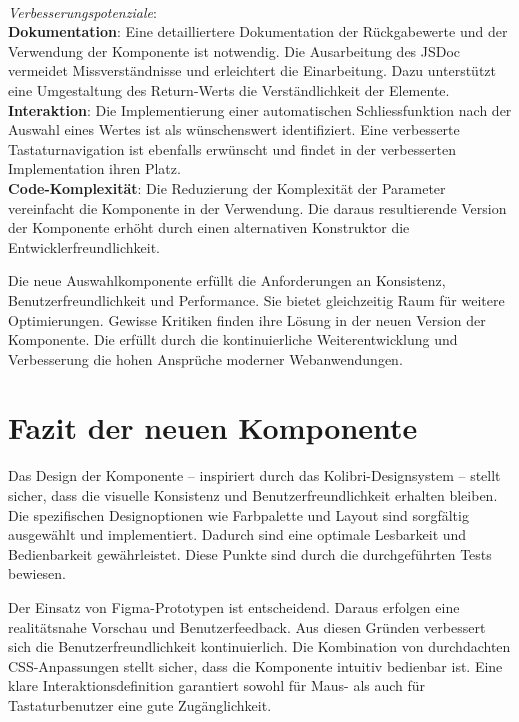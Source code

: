 \\
\noindent
\emph{Verbesserungspotenziale}: 
\\
\textbf{Dokumentation}: 
Eine detailliertere Dokumentation der Rückgabewerte und der Verwendung der Komponente ist notwendig. 
Die Ausarbeitung des JSDoc vermeidet Missverständnisse und erleichtert die Einarbeitung. 
Dazu unterstützt eine Umgestaltung des Return-Werts die Verständlichkeit der Elemente. 
\\
\textbf{Interaktion}: 
Die Implementierung einer automatischen Schliessfunktion nach der Auswahl eines Wertes ist als wünschenswert identifiziert. 
Eine verbesserte Tastaturnavigation ist ebenfalls erwünscht und findet in der verbesserten Implementation ihren Platz. 
\\
\textbf{Code-Komplexität}: 
Die Reduzierung der Komplexität der Parameter vereinfacht die Komponente in der Verwendung. 
Die daraus resultierende Version der Komponente erhöht durch einen alternativen Konstruktor die Entwicklerfreundlichkeit. 

Die neue Auswahlkomponente erfüllt die Anforderungen an Konsistenz, Benutzerfreundlichkeit und Performance. 
Sie bietet gleichzeitig Raum für weitere Optimierungen. 
Gewisse Kritiken finden ihre Lösung in der neuen Version der Komponente. 
Die  erfüllt durch die kontinuierliche Weiterentwicklung und Verbesserung die hohen Ansprüche moderner Webanwendungen. 


\section{Fazit der neuen Komponente}
\label{sec:summeryNew}

Das Design der Komponente – inspiriert durch das Kolibri-Designsystem – stellt sicher, dass die visuelle Konsistenz und Benutzerfreundlichkeit erhalten bleiben. 
Die spezifischen Designoptionen wie Farbpalette und Layout sind sorgfältig ausgewählt und implementiert. 
Dadurch sind eine optimale Lesbarkeit und Bedienbarkeit gewährleistet. 
Diese Punkte sind durch die durchgeführten Tests bewiesen. 

Der Einsatz von Figma-Prototypen ist entscheidend. 
Daraus erfolgen eine realitätsnahe Vorschau und Benutzerfeedback. 
Aus diesen Gründen verbessert sich die Benutzerfreundlichkeit kontinuierlich. 
Die Kombination von durchdachten CSS-Anpassungen stellt sicher, dass die Komponente intuitiv bedienbar ist. 
Eine klare Interaktionsdefinition garantiert sowohl für Maus- als auch für Tastaturbenutzer eine gute Zugänglichkeit. 

